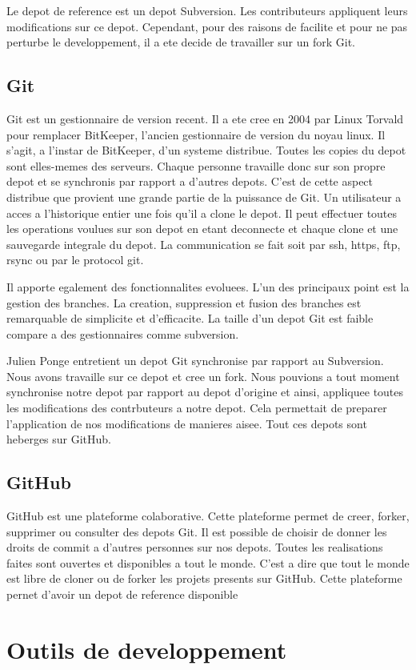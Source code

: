Le depot de reference est un depot Subversion. Les contributeurs appliquent leurs modifications sur ce depot. Cependant, pour des raisons de facilite et pour ne pas perturbe le developpement, il a ete decide de travailler sur un fork Git.
\subsection{Git}
Git est un gestionnaire de version recent. Il a ete cree en 2004 par Linux Torvald pour remplacer BitKeeper, l'ancien gestionnaire de version du noyau linux. Il s'agit, a l'instar de BitKeeper, d'un systeme distribue. Toutes les copies du depot sont elles-memes des serveurs. Chaque personne travaille donc sur son propre depot et se synchronis par rapport a d'autres depots. C'est de cette aspect distribue que provient une grande partie de la puissance de Git. Un utilisateur a acces a l'historique entier une fois qu'il a clone le depot. Il peut effectuer toutes les operations voulues sur son depot en etant deconnecte et chaque clone et une sauvegarde integrale du depot. La communication se fait soit par ssh, https, ftp, rsync ou par le protocol git.

Il apporte egalement des fonctionnalites evoluees. L'un des principaux point est la gestion des branches. La creation, suppression et fusion des branches est remarquable de simplicite et d'efficacite. La taille d'un depot Git est faible compare a des gestionnaires comme subversion.

Julien Ponge entretient un depot Git synchronise par rapport au Subversion. Nous avons travaille sur ce depot et cree un fork. Nous pouvions a tout moment synchronise notre depot par rapport au depot d'origine et ainsi, appliquee toutes les modifications des contrbuteurs a notre depot. Cela permettait de preparer l'application de nos modifications de manieres aisee. Tout ces depots sont heberges sur GitHub.
\subsection{GitHub}
GitHub est une plateforme colaborative. Cette plateforme permet de creer, forker, supprimer ou consulter des depots Git. Il est possible de choisir de donner les droits de commit a d'autres personnes sur nos depots. Toutes les realisations faites sont ouvertes et disponibles a tout le monde. C'est a dire que tout le monde est libre de cloner ou de forker les projets presents sur GitHub. Cette plateforme pernet d'avoir un depot de reference disponible 
\section{Outils de developpement}
